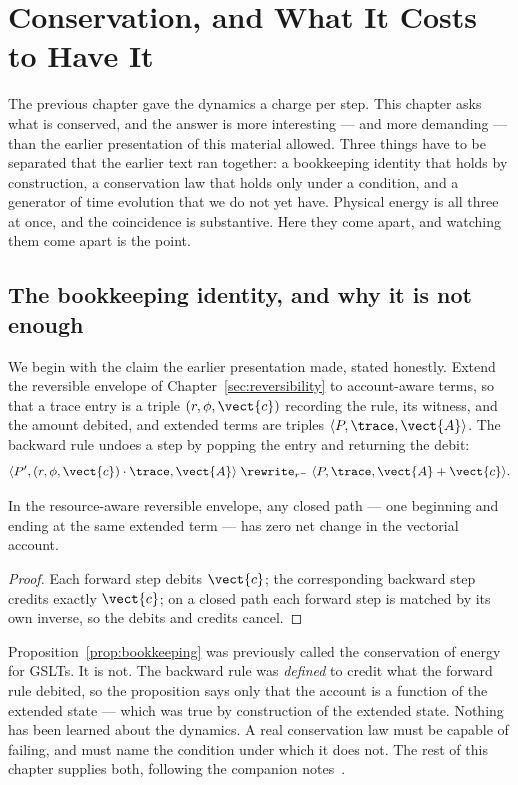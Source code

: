\chapter{Conservation, and What It Costs to Have It}
\label{sec:cost}

The previous chapter gave the dynamics a charge per step.  This chapter
asks what is conserved, and the answer is more interesting --- and more
demanding --- than the earlier presentation of this material allowed.
Three things have to be separated that the earlier text ran together: a
bookkeeping identity that holds by construction, a conservation law that
holds only under a condition, and a generator of time evolution that we do
not yet have.  Physical energy is all three at once, and the coincidence
is substantive.  Here they come apart, and watching them come apart is
the point.

\section{The bookkeeping identity, and why it is not enough}

We begin with the claim the earlier presentation made, stated honestly.
Extend the reversible envelope of Chapter~\ref{sec:reversibility} to
account-aware terms, so that a trace entry is a triple
$(r, \phi, \vect{c})$ recording the rule, its witness, and the amount
debited, and extended terms are triples
$\langle P, \trace, \vect{A}\rangle$.  The backward rule undoes a step by
popping the entry and returning the debit:
\[
  \langle P', (r,\phi,\vect{c}) \cdot \trace, \vect{A} \rangle
  \;\rewrite_{r^-}\;
  \langle P, \trace, \vect{A} + \vect{c} \rangle.
\]

\begin{proposition}
\label{prop:bookkeeping}
In the resource-aware reversible envelope, any closed path --- one
beginning and ending at the same extended term --- has zero net change in
the vectorial account.
\end{proposition}

\begin{proof}
Each forward step debits $\vect{c}$; the corresponding backward step
credits exactly $\vect{c}$; on a closed path each forward step is matched
by its own inverse, so the debits and credits cancel.
\end{proof}

\begin{remark}
\label{rmk:critique}
Proposition~\ref{prop:bookkeeping} was previously called the conservation
of energy for GSLTs.  It is not.  The backward rule was \emph{defined} to
credit what the forward rule debited, so the proposition says only that
the account is a function of the extended state --- which was true by
construction of the extended state.  Nothing has been learned about the
dynamics.  A real conservation law must be capable of failing, and must
name the condition under which it does not.  The rest of this chapter
supplies both, following the companion notes~\cite{vtok,History}.
\end{remark}


